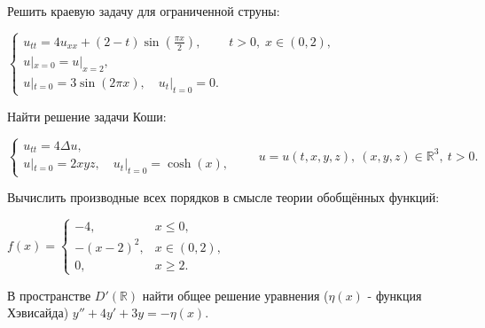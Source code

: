 
\begin{cond}
	Решить краевую задачу для ограниченной струны:

	\(
	\begin{cases}
		u_{tt} = 4u_{xx} + (2 - t)\sin (\frac{\pi x}{2}), & t > 0,\; x \in (0,2), \\
		u|_{x=0} = u|_{x=2},                                                      \\
		u|_{t=0} = 3 \sin (2\pi x),\quad u_t|_{t=0} = 0.
	\end{cases}
	\)
\end{cond}

\begin{sol}

\end{sol}

\begin{out}

\end{out}

\begin{cond}
	Найти решение задачи Коши:

	\(
	\begin{cases}
		u_{tt} = 4\Delta u, \\
		u|_{t=0} = 2xyz,\quad u_t|_{t=0} = \cosh (x),
	\end{cases}
	\qquad
	u = u(t,x,y,z),\ (x,y,z)\in\mathbb{R}^3,\ t>0.
	\)
\end{cond}

\begin{sol}

\end{sol}

\begin{out}

\end{out}

\begin{cond}
	Вычислить производные всех порядков в смысле теории обобщённых функций:

	\(
	f(x) =
	\begin{cases}
		-4,       & x \le 0,     \\
		-(x-2)^2, & x \in (0,2), \\
		0,        & x \ge 2.
	\end{cases}
	\)
\end{cond}

\begin{cond}
	В пространстве $D'(\mathbb{R})$ найти общее решение уравнения ($\eta(x)$ - функция Хэвисайда)
	$y'' + 4y' + 3y = -\eta(x)$.
\end{cond}

\begin{sol}

\end{sol}

\begin{out}

\end{out}
